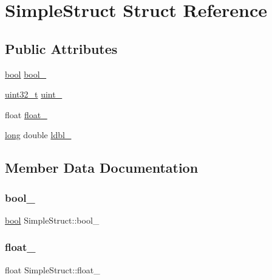 \hypertarget{struct_simple_struct}{}\section{Simple\+Struct Struct Reference}
\label{struct_simple_struct}
\subsection*{Public Attributes}
\begin{DoxyCompactItemize}
\item 
\mbox{\hyperlink{asdl_8h_af6a258d8f3ee5206d682d799316314b1}{bool}} \mbox{\hyperlink{struct_simple_struct_a958883bc82f98a332467f8c370ce991a}{bool\+\_\+}}
\item 
\mbox{\hyperlink{_s_d_l__config_8h_a435d1572bf3f880d55459d9805097f62}{uint32\+\_\+t}} \mbox{\hyperlink{struct_simple_struct_a7d5d19cdba8fe4db03afd905afcb08f6}{uint\+\_\+}}
\item 
float \mbox{\hyperlink{struct_simple_struct_a2f0d1f820f98446d2ccef83eae031c2b}{float\+\_\+}}
\item 
\mbox{\hyperlink{modsupport_8h_a0cb68e00fb9fb1260ee2daadd9fe6611}{long}} double \mbox{\hyperlink{struct_simple_struct_a0acda54a97a0971c9672ff8772433a22}{ldbl\+\_\+}}
\end{DoxyCompactItemize}


\subsection{Member Data Documentation}
\mbox{\label{struct_simple_struct_a958883bc82f98a332467f8c370ce991a}} 
\subsubsection{\texorpdfstring{bool\_}{bool\_}}
{\footnotesize\ttfamily \mbox{\hyperlink{asdl_8h_af6a258d8f3ee5206d682d799316314b1}{bool}} Simple\+Struct\+::bool\+\_\+}

\mbox{\label{struct_simple_struct_a2f0d1f820f98446d2ccef83eae031c2b}} 
\subsubsection{\texorpdfstring{float\_}{float\_}}
{\footnotesize\ttfamily float Simple\+Struct\+::float\+\_\+}

